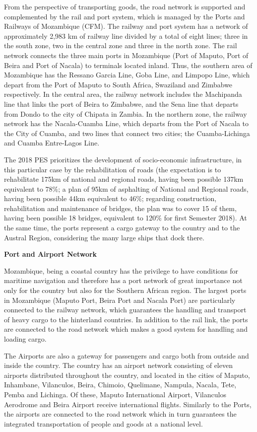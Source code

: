 \documentclass[
]{book}
\begin{document}
From the perspective of transporting goods, the road network is supported and complemented by the rail and port system, which is managed by the Ports and Railways of Mozambique (CFM). The railway and port system has a network of approximately 2,983 km of railway line divided by a total of eight lines; three in the south zone, two in the central zone and three in the north zone. The rail network connects the three main ports in Mozambique (Port of Maputo, Port of Beira and Port of Nacala) to terminals located inland. Thus, the southern area of Mozambique has the Ressano Garcia Line, Goba Line, and Limpopo Line, which depart from the Port of Maputo to South Africa, Swaziland and Zimbabwe respectively. In the central area, the railway network includes the Machipanda line that links the port of Beira to Zimbabwe, and the Sena line that departs from Dondo to the city of Chipata in Zambia. In the northern zone, the railway network has the Nacala-Cuamba Line, which departs from the Port of Nacala to the City of Cuamba, and two lines that connect two cities; the Cuamba-Lichinga and Cuamba Entre-Lagos Line.

The 2018 PES prioritizes the development of socio-economic infrastructure, in this particular case by the rehabilitation of roads (the expectation is to rehabilitate 175km of national and regional roads, having been possible 137km equivalent to 78\%; a plan of 95km of asphalting of National and Regional roads, having been possible 44km equivalent to 46\%; regarding construction, rehabilitation and maintenance of bridges, the plan was to cover 15 of them, having been possible 18 bridges, equivalent to 120\% for first Semester 2018). At the same time, the ports represent a cargo gateway to the country and to the Austral Region, considering the many large ships that dock there.

\textbf{Port and Airport Network}

Mozambique, being a coastal country has the privilege to have conditions for maritime navigation and therefore has a port network of great importance not only for the country but also for the Southern African region. The largest ports in Mozambique (Maputo Port, Beira Port and Nacala Port) are particularly connected to the railway network, which guarantees the handling and transport of heavy cargo to the hinterland countries. In addition to the rail link, the ports are connected to the road network which makes a good system for handling and loading cargo.

The Airports are also a gateway for passengers and cargo both from outside and inside the country. The country has an airport network consisting of eleven airports distributed throughout the country, and located in the cities of Maputo, Inhambane, Vilanculos, Beira, Chimoio, Quelimane, Nampula, Nacala, Tete, Pemba and Lichinga. Of these, Maputo International Airport, Vilanculos Aerodrome and Beira Airport receive international flights. Similarly to the Ports, the airports are connected to the road network which in turn guarantees the integrated transportation of people and goods at a national level.
\end{document}
